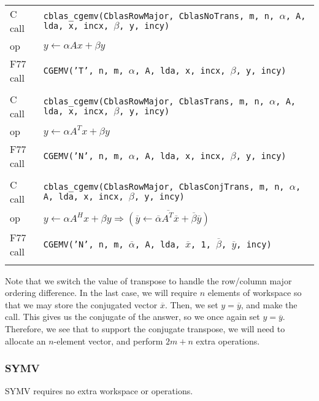\documentclass{article}
\begin{document}
\noindent
{\small
\begin{tabular}{ll}
C call   & {\tt cblas\_cgemv(CblasRowMajor, CblasNoTrans, m, n, $\alpha$, A, lda, x, incx, $\beta$, y, incy)}\\
op       & $y \leftarrow \alpha A x + \beta y$\\
F77 call & {\tt CGEMV('T', n, m, $\alpha$, A, lda, x, incx, $\beta$, y, incy)}\\\\
%
C call   & {\tt cblas\_cgemv(CblasRowMajor, CblasTrans, m, n, $\alpha$, A, lda, x, incx, $\beta$, y, incy)}\\
op       & $y \leftarrow \alpha A^T x + \beta y$\\
F77 call & {\tt CGEMV('N', n, m, $\alpha$, A, lda, x, incx, $\beta$, y, incy)}\\\\
%
C call   & {\tt cblas\_cgemv(CblasRowMajor, CblasConjTrans, m, n, $\alpha$, A, lda, x, incx, $\beta$, y, incy)}\\
op       & $y \leftarrow \alpha A^H x + \beta y \Rightarrow 
           \overline{(\overline{y} \leftarrow \overline{\alpha} A^T \overline{x} + 
            \overline{\beta} \overline{y})}$\\
F77 call & {\tt CGEMV('N', n, m, $\overline{\alpha}$, A, lda, $\overline{x}$, 1, $\overline{\beta}$, $\overline{y}$, incy)}\\\\
\end{tabular}
}

Note that we switch the value of transpose to handle the row/column major
ordering difference.
In the last case, we will require $n$ elements of workspace so that
we may store the conjugated vector $\overline{x}$.  Then, we set $y = \overline{y}$, and
make the call.  This gives
us the conjugate of the answer, so we once again set $y = \overline{y}$.  Therefore, we
see that to support the conjugate transpose, we will need to allocate an $n$-element
vector, and perform $2m+n$ extra operations. 

\subsubsection{SYMV}

SYMV requires no extra workspace or operations.
\end{document}
